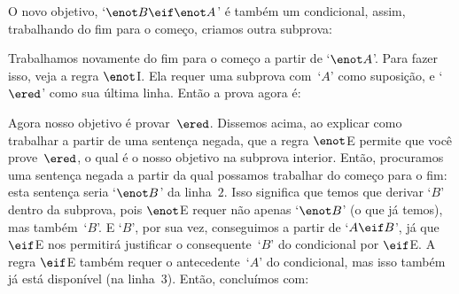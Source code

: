 \begin{fitchproof}
\open
{}
\ellipsesline
{}
\close
{}
\end{fitchproof}
O novo objetivo, `$\enot B \eif \enot A$' é  também  um  condicional, assim, trabalhando do fim para o começo, criamos outra subprova:

\begin{fitchproof}
	\open
	\open
	\ellipsesline
	\close
	\close
\end{fitchproof}
Trabalhamos novamente do fim para o começo a partir de `$\enot A$'.  Para fazer isso, veja a regra $\enot$I. Ela requer uma subprova com~`$A$' como suposição, e `$\ered$' como sua última linha. Então a prova agora é:
 
\begin{fitchproof}
	\open
	\open
	\open{}
	\ellipsesline
	\close
	\close
	\close
\end{fitchproof}
Agora nosso objetivo é provar~$\ered$. Dissemos acima, ao explicar como trabalhar a partir de uma sentença negada, que a regra $\enot$E permite que você prove~$\ered$, o qual é o nosso objetivo na subprova interior. Então, procuramos uma sentença negada a partir da qual possamos trabalhar do começo para o fim: esta sentença seria `$\enot B$' da linha~$2$. Isso significa que temos que derivar `$B$' dentro da subprova, pois $\enot$E requer não apenas `$\enot B$' (o que já temos), mas também~`$B$'. E `$B$', por sua vez, conseguimos a partir de `$A \eif B$', já que $\eif$E nos permitirá justificar o consequente~`$B$' do condicional por $\eif$E. A regra $\eif$E também requer o antecedente~`$A$' do condicional, mas isso também já está disponível (na linha~$3$). Então, concluímos  com:


\begin{fitchproof}
	\open
	\open
	\open{}
	\close
	\close
	\close
\end{fitchproof}

